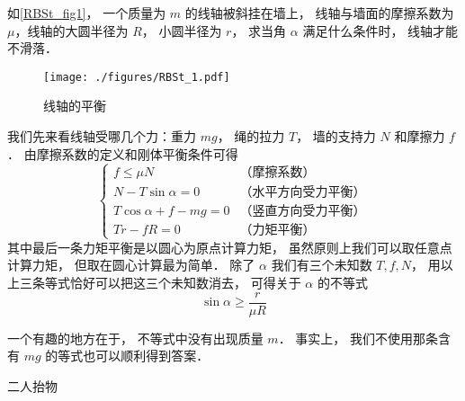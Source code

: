 \begin{example}{}\label{RBSt_ex1}
如\autoref{RBSt_fig1}， 一个质量为 $m$ 的线轴被斜挂在墙上， 线轴与墙面的摩擦系数为 $\mu$，线轴的大圆半径为 $R$， 小圆半径为 $r$， 求当角 $\alpha$ 满足什么条件时， 线轴才能不滑落．
\begin{figure}[ht]
\centering
\texttt{[image: ./figures/RBSt\_1.pdf]}
\caption{线轴的平衡} \label{RBSt_fig1}
\end{figure}

我们先来看线轴受哪几个力：重力 $mg$， 绳的拉力 $T$， 墙的支持力 $N$ 和摩擦力 $f$． 由摩擦系数的定义和刚体平衡条件可得
\begin{equation}
\begin{cases}
f \leqslant \mu N & \text{（摩擦系数）}\\
N - T\sin\alpha = 0 & \text{（水平方向受力平衡）}\\
T\cos\alpha + f - mg = 0 & \text{（竖直方向受力平衡）}\\
Tr - fR = 0 & \text{（力矩平衡）}
\end{cases}
\end{equation}
其中最后一条力矩平衡是以圆心为原点计算力矩， 虽然原则上我们可以取任意点计算力矩， 但取在圆心计算最为简单． 除了 $\alpha$ 我们有三个未知数 $T, f, N$， 用以上三条等式恰好可以把这三个未知数消去， 可得关于 $\alpha$ 的不等式
\begin{equation}
\sin\alpha \geqslant \frac{r}{\mu R}
\end{equation}

一个有趣的地方在于， 不等式中没有出现质量 $m$． 事实上， 我们不使用那条含有 $mg$ 的等式也可以顺利得到答案．
\end{example}
\begin{example}{二人抬物}

\end{example}